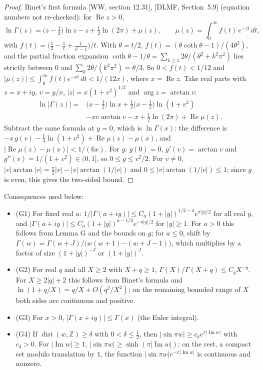 \documentclass[11pt]{article}
\newcommand{\re}{\operatorname{Re}}
\newcommand{\im}{\operatorname{Im}}
\newcommand{\dist}{\operatorname{dist}}
\begin{document}
\begin{proof}
Binet's first formula [WW, section 12.31], [DLMF, Section~5.9] (equation numbers not re-checked): for $\re z>0$,
\[
\ln\Gamma(z)=\bigl(z-\tfrac12\bigr)\ln z-z+\tfrac12\ln(2\pi)+\mu(z),\qquad \mu(z)=\int_0^\infty f(t)\,e^{-zt}\,dt,
\]
with $f(t)=\bigl(\frac12-\frac1t+\frac{1}{e^t-1}\bigr)/t$. With $\theta=t/2$, $f(t)=(\theta\coth\theta-1)/(4\theta^2)$, and the partial fraction expansion $\coth\theta-1/\theta=\sum_{k\ge1}2\theta/(\theta^2+k^2\pi^2)$ lies strictly between $0$ and $\sum_k2\theta/(k^2\pi^2)=\theta/3$. So $0<f(t)<1/12$ and $|\mu(z)|\le\int_0^\infty f(t)e^{-xt}\,dt<1/(12x)$, where $x=\re z$. Take real parts with $z=x+iy$, $v=y/x$, $|z|=x(1+v^2)^{1/2}$ and $\arg z=\arctan v$:
\begin{align*}
\ln|\Gamma(z)|={}&\bigl(x-\tfrac12\bigr)\ln x+\tfrac12\bigl(x-\tfrac12\bigr)\ln(1+v^2)\\
&-xv\arctan v-x+\tfrac12\ln(2\pi)+\re\mu(z).
\end{align*}
Subtract the same formula at $y=0$, which is $\ln\Gamma(x)$: the difference is $-x\,g(v)-\frac14\ln(1+v^2)+\re\mu(z)-\mu(x)$, and $|\re\mu(z)-\mu(x)|<1/(6x)$. For $g$: $g(0)=0$, $g'(v)=\arctan v$ and $g''(v)=1/(1+v^2)\in(0,1]$, so $0\le g\le v^2/2$. For $v\ne0$, $|v|\arctan|v|=\frac\pi2|v|-|v|\arctan(1/|v|)$ and $0\le|v|\arctan(1/|v|)\le1$; since $g$ is even, this gives the two-sided bound.
\end{proof}

Consequences used below:
\begin{itemize}
\item (G1) For fixed real $a$: $1/|\Gamma(a+iy)|\le C_a(1+|y|)^{1/2-a}e^{\pi|y|/2}$ for all real $y$, and $|\Gamma(a+iy)|\le C_a(1+|y|)^{a-1/2}e^{-\pi|y|/2}$ for $|y|\ge1$. For $a>0$ this follows from Lemma G and the bounds on $g$; for $a\le0$, shift by $\Gamma(w)=\Gamma(w+J)/\bigl(w(w+1)\cdots(w+J-1)\bigr)$, which multiplies by a factor of size $(1+|y|)^{-J}$ or $(1+|y|)^{J}$.
\item (G2) For real $q$ and all $X\ge2$ with $X+q\ge1$, $\Gamma(X)/\Gamma(X+q)\le C_qX^{-q}$. For $X\ge2|q|+2$ this follows from Binet's formula and $\ln(1+q/X)=q/X+O(q^2/X^2)$; on the remaining bounded range of $X$ both sides are continuous and positive.
\item (G3) For $x>0$, $|\Gamma(x+iy)|\le\Gamma(x)$ (the Euler integral).
\item (G4) If $\dist(w,\mathbb{Z})\ge\delta$ with $0<\delta\le\frac12$, then $|\sin\pi w|\ge c_\delta e^{\pi|\im w|}$ with $c_\delta>0$. For $|\im w|\ge1$, $|\sin\pi w|\ge\sinh(\pi|\im w|)$; on the rest, a compact set modulo translation by $1$, the function $|\sin\pi w|e^{-\pi|\im w|}$ is continuous and nonzero.
\end{itemize}
\end{document}
